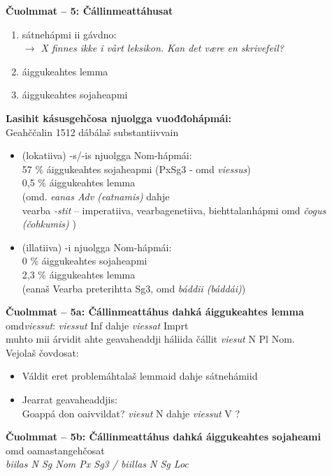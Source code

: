 \documentclass[landscape,norsk,11pt]{seminar}
\begin{document}
\begin{slide}
\newslide
\textbf{Čuolmmat -- 5: Čállinmeattáhusat} \\
\begin{enumerate}
\item sátnehápmi ii gávdno: \\ \textit{$\rightarrow$ X finnes ikke i vårt leksikon. Kan det være en skrivefeil?}
\item áiggukeahtes lemma
\item áiggukeahtes sojaheapmi
\end{enumerate}

\newslide
\textbf{Lasihit kásusgehčosa njuolgga vuođđohápmái:} \\
Geahččalin 1512 dábálaš substantiivvain 
\begin{itemize}
\item (lokatiiva) -s/-is njuolgga Nom-hápmái: \\
57 \% áiggukeahtes sojaheapmi (PxSg3 - omd \textit{viessus})  \\  0,5 \% áiggukeahtes lemma \\  (omd. \textit{eanas Adv (eatnamis)}  dahje \\ vearba \textit{-stit} -- imperatiiva, vearbagenetiiva, biehttalanhápmi omd \textit{čogus (čohkumis)} )
\item (illatiiva) -i njuolgga Nom-hápmái: \\
0 \% áiggukeahtes sojaheapmi \\  2,3 \% áiggukeahtes lemma \\ (eanaš Vearba preterihtta Sg3, omd \textit{báddii (báddái)}) 
\end{itemize}



\newslide
\textbf{Čuolmmat -- 5a: Čállinmeattáhus dahká áiggukeahtes lemma} \\
omd\textit{viessut}: \textit{viessut} Inf dahje \textit{viessat} Imprt \\
muhto mii árvidit ahte geavaheaddji háliida čállit \textit{viesut} N Pl Nom. \\
Vejolaš čovdosat:

\begin{itemize}
\item{Váldit eret problemáhtalaš lemmaid dahje sátnehámiid}
\item{Jearrat geavaheaddjis: \\ Goappá don oaivvildat? \textit{viesut}  N dahje \textit{viessut} V }?
\end{itemize}


\newslide
\textbf{Čuolmmat -- 5b: Čállinmeattáhus dahká áiggukeahtes sojaheami} \\
omd oamastangehčosat \\
\textit{biilas N Sg Nom Px Sg3 / biillas N Sg Loc} \\


\end{slide}
\end{document}
